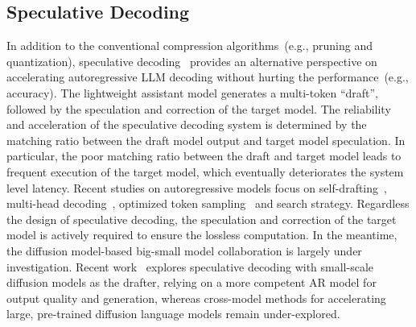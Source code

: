 \subsection{Speculative Decoding}
In addition to the conventional compression algorithms~(e.g., pruning and quantization), speculative decoding~\cite{leviathan2023fast} provides an alternative perspective on accelerating autoregressive LLM decoding without hurting the performance~(e.g., accuracy). The lightweight assistant model generates a multi-token ``draft'', followed by the speculation and correction of the target model. 
The reliability and acceleration of the speculative decoding system is determined by the matching ratio between the draft model output and target model speculation. In particular, the poor matching ratio between the draft and target model leads to frequent execution of the target model, which eventually deteriorates the system level latency. 
Recent studies on autoregressive models focus on self-drafting~\cite{elhoushi2024layerskip, liu2024kangaroo}, multi-head decoding~\cite{cai2024medusa}, optimized token sampling~\cite{chensequoia} and search strategy. 
Regardless the design of speculative decoding, the speculation and correction of the target model is actively required to ensure the lossless computation. 
In the meantime, the diffusion model-based big-small model collaboration is largely under investigation. 
Recent work~\cite{christopher2024speculative} explores speculative decoding with small-scale diffusion models as the drafter, relying on a more competent AR model for output quality and generation, whereas cross-model methods for accelerating large, pre-trained diffusion language models remain under-explored.


